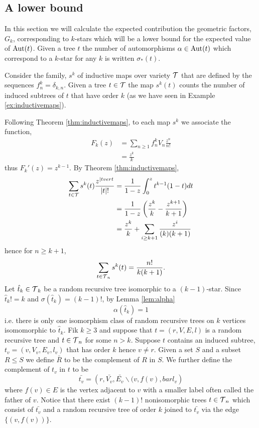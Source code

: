 \subsection{A lower bound}
In this section we will calculate the expected contribution the geometric factors, $G_k$, corresponding to $k$-stars which will be a 
lower bound for the expected value of $\operatorname{Aut}(t)$.  Given a  tree $t$ the number of automorphisms $\alpha \in \operatorname{Aut}(t)$ which correspond 
to a $k$-star for any $k$ is written $\sigma_*(t)$.

Consider the family, $s^k$ of inductive maps over variety $\operatorname{\mathcal{T}}$ that are defined by the sequences $f^k_n = \delta_{k,n}$.  Given a tree 
$t \in \operatorname{\mathcal{T}}$ the map $s^{k}(t)$ counts the number of induced subtrees of $t$ that have order $k$ (as we have seen in Example 
\ref{ex:inductivemaps}). 

Following Theorem \ref{thm:inductivemaps}, to each map $s^k$ we associate the function,
\begin{align}
 F_k(z) &= \sum_{n \geq 1} f_n^k V_n \frac{z^{n}}{n!} \\
 &= \frac{z^k}{k}
\end{align}
thus $F_k'(z) = z^{k-1}$.  By Theorem \ref{thm:inductivemaps},
\begin{align}
 \sum_{t \in \operatorname{\mathcal{T}}} s^k(t) \frac{z^{\lvert t vert}}{\lvert t \rvert !}  &= \frac{1}{1-z}\int_{0}^{z}t^{k-1}(1-t) dt \\
 &= \frac{1}{1-z}\left(\frac{z^k}{k} - \frac{z^{k+1}}{k+1} \right)  \\
 &= \frac{z^{k}}{k} + \sum_{i \geq k+1} \frac{z^i}{(k)(k+1)}
\end{align}
hence for $n \geq k+1$,
\[
 \sum_{t \in \operatorname{\mathcal{T}}_n} s^k(t) = \frac{n!}{k(k+1)}.
\]
Let $\hat{t}_k \in \operatorname{\mathcal{T}}_k$ be a random recursive tree isomorphic to a $(k-1)$-star.  Since $\hat{t}_k ! = k$ and $\sigma(\hat{t}_k) = (k-1)!$, 
by Lemma \ref{lem:alpha} 
\[
 \alpha(\hat{t}_k) = 1
\]
i.e. there is only one isomorphism class of random recursive trees on $k$ vertices isomomorphic to $\hat{t}_k$.  Fik $k \geq 3$ 
and suppose that $t = (r,V,E,l)$ is a random recursive tree and $t \in \operatorname{\mathcal{T}}_n$ for some $n >k$.  Suppose $t$ contains an induced 
subtree, $t_v = (v,V_v,E_v,l_v)$ that has order $k$ hence $v \neq r$.  Given a set $S$ and a subset $R \leq S$ we define $\bar{R}$ 
to be the complement of $R$ in $S$.  We further define the complement of $t_v$ in $t$ to be 
\[\bar{t_v} = (r, \bar{V_v},\bar{E_v} \backslash{(v,f(v)},bar{l_v})\]
where $f(v) \in E$ is the vertex adjacent to $v$ with a smaller label often called the father of $v$.  Notice that there exist $(k-1)!$ nonisomorphic trees $t \in \operatorname{\mathcal{T}}_n$ 
which consist of $\bar{t_v}$ and a random recursive tree of order $k$ joined to $\bar{t_v}$  via the edge $\{(v,f(v))\}$.

